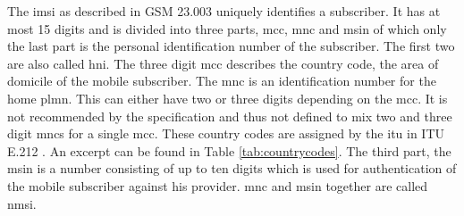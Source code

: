 The \gls{imsi} as described in GSM 23.003\cite{GSM23003} uniquely identifies a subscriber.
It has at most 15 digits and is divided into three parts, \gls{mcc}, \gls{mnc} and \gls{msin} of which only the last part is the personal identification number of the subscriber.
The first two are also called \gls{hni}.
The three digit \gls{mcc} describes the country code, the area of domicile of the mobile subscriber.
The \gls{mnc} is an identification number for the home \gls{plmn}.
This can either have two or three digits depending on the \gls{mcc}.
It is not recommended by the specification and thus not defined to mix two and three digit \gls{mnc}s for a single \gls{mcc}.
These country codes are assigned by the \gls{itu} in ITU E.212 \cite{ITU212}.
An excerpt can be found in Table \ref{tab:countrycodes}.
The third part, the \gls{msin} is a number consisting of up to ten digits which is used for authentication of the mobile subscriber against his provider.
\gls{mnc} and \gls{msin} together are called \gls{nmsi}.
\begin{table}
\centering
{}
\hspace{.5cm}
\caption{Mobile Country and Network Codes. (R) denotes that the MCC is reserved but not operational as of yet, whereas (T) denotes a operational test network.}
\label{tab:countrycodes}
\end{table}

